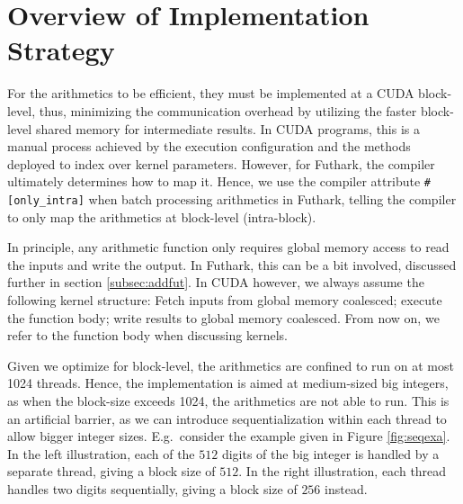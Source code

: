 \section{Overview of Implementation Strategy}
\label{sec:strat}

For the arithmetics to be efficient, they must be implemented at a CUDA
block-level, thus, minimizing the communication overhead by utilizing the faster
block-level shared memory for intermediate results. In CUDA programs, this is a
manual process achieved by the execution configuration and the methods deployed
to index over kernel parameters. However, for Futhark, the compiler ultimately
determines how to map it. Hence, we use the compiler attribute
\texttt{\#[only\_intra]} when batch processing arithmetics in Futhark, telling
the compiler to only map the arithmetics at block-level (intra-block).

In principle, any arithmetic function only requires global memory access to read
the inputs and write the output. In Futhark, this can be a bit involved,
discussed further in section \ref{subsec:addfut}. In CUDA however, we always
assume the following kernel structure: Fetch inputs from global memory
coalesced; execute the function body; write results to global memory
coalesced. From now on, we refer to the function body when discussing kernels.

Given we optimize for block-level, the arithmetics are confined to run on at
most 1024 threads.  Hence, the implementation is aimed at medium-sized big
integers, as when the block-size exceeds 1024, the arithmetics are not able to
run. This is an artificial barrier, as we can introduce sequentialization within
each thread to allow bigger integer sizes. E.g.\ consider the example given in
Figure \ref{fig:seqexa}. In the left illustration, each of the $512$ digits of
the big integer is handled by a separate thread, giving a block size of
$512$. In the right illustration, each thread handles two digits sequentially,
giving a block size of $256$ instead.

